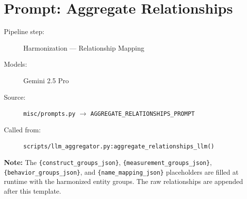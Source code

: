 \section*{Prompt: Aggregate Relationships}
\begin{description}
\item[Pipeline step:] Harmonization --- Relationship Mapping
\item[Models:] Gemini 2.5 Pro
\item[Source:] \texttt{misc/prompts.py} $\rightarrow$ \texttt{AGGREGATE\_RELATIONSHIPS\_PROMPT}
\item[Called from:] \texttt{scripts/llm\_aggregator.py:aggregate\_relationships\_llm()}
\end{description}
\begin{tcolorbox}[colback=yellow!8,colframe=yellow!50!black,left=4pt,right=4pt,top=4pt,bottom=4pt,arc=2pt]
\textbf{Note:} The \texttt{\{construct\_groups\_json\}}, \texttt{\{measurement\_groups\_json\}}, \texttt{\{behavior\_groups\_json\}}, and \texttt{\{name\_mapping\_json\}} placeholders are filled at runtime with the harmonized entity groups. The raw relationships are appended after this template.
\end{tcolorbox}

